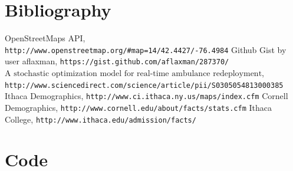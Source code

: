 \documentclass[titlepage]{article}
\begin{document}
\section{Bibliography}
\begin{thebibliography}{9}

 OpenStreetMaps API,
\verb|http://www.openstreetmap.org/#map=14/42.4427/-76.4984|
 Github Gist by user aflaxman,
\verb|https://gist.github.com/aflaxman/287370/|
 $\text{A stochastic optimization model for real-time ambulance redeployment}$,
\\\verb|http://www.sciencedirect.com/science/article/pii/S0305054813000385|
 Ithaca Demographics,
\verb|http://www.ci.ithaca.ny.us/maps/index.cfm|
 Cornell Demographics,
\verb|http://www.cornell.edu/about/facts/stats.cfm|
 Ithaca College,
\verb|http://www.ithaca.edu/admission/facts/|


\end{thebibliography}

\pagebreak

\section{Code}


\end{document}
